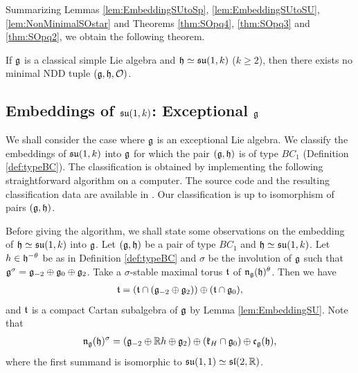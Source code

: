 Summarizing Lemmas \ref{lem:EmbeddingSUtoSp}, \ref{lem:EmbeddingSUtoSU}, \ref{lem:NonMinimalSOstar} and Theorems \ref{thm:SOpq4}, \ref{thm:SOpq3} and \ref{thm:SOpq2}, we obtain the following theorem.

\begin{theorem} \label{thm:NonMinimalClassical}
	If $\mathfrak{g}$ is a classical simple Lie algebra and $\mathfrak{h} \simeq \mathfrak{su}(1, k)$ ($k \geq 2$), then there exists no minimal NDD tuple $(\mathfrak{g}, \mathfrak{h}, \mathcal{O})$.
\end{theorem}

\subsection{Embeddings of \texorpdfstring{$\mathfrak{su}(1, k)$}{su(1,k)}: Exceptional \texorpdfstring{$\mathfrak{g}$}{g}}

We shall consider the case where $\mathfrak{g}$ is an exceptional Lie algebra.
We classify the embeddings of $\mathfrak{su}(1, k)$ into $\mathfrak{g}$ for which the pair $(\mathfrak{g}, \mathfrak{h})$ is of type $BC_1$ (Definition \ref{def:typeBC}).
The classification is obtained by implementing the following straightforward algorithm on a computer.
The source code and the resulting classification data are available in \cite{Ki26-code}.
Our classification is up to isomorphism of pairs $(\mathfrak{g}, \mathfrak{h})$.

Before giving the algorithm, we shall state some observations on the embedding of $\mathfrak{h} \simeq \mathfrak{su}(1, k)$ into $\mathfrak{g}$.
Let $(\mathfrak{g}, \mathfrak{h})$ be a pair of type $BC_1$ and $\mathfrak{h} \simeq \mathfrak{su}(1, k)$.
Let $h \in \mathfrak{h}^{-\theta}$ be as in Definition \ref{def:typeBC} and $\sigma$ be the involution of $\mathfrak{g}$ such that $\mathfrak{g}^\sigma = \mathfrak{g}_{-2} \oplus \mathfrak{g}_0 \oplus \mathfrak{g}_2$.
Take a $\sigma$-stable maximal torus $\mathfrak{t}$ of $\mathfrak{n}_{\mathfrak{g}}(\mathfrak{h})^\theta$.
Then we have
\begin{align*}
	\mathfrak{t} = (\mathfrak{t}\cap (\mathfrak{g}_{-2} \oplus \mathfrak{g}_2)) \oplus (\mathfrak{t}\cap \mathfrak{g}_0),
\end{align*}
and $\mathfrak{t}$ is a compact Cartan subalgebra of $\mathfrak{g}$ by Lemma \ref{lem:EmbeddingSU}.
Note that
\begin{align*}
	\mathfrak{n}_{\mathfrak{g}}(\mathfrak{h})^\sigma = (\mathfrak{g}_{-2}\oplus \mathbb{R} h \oplus \mathfrak{g}_2) \oplus (\mathfrak{k}_H\cap \mathfrak{g}_0) \oplus \mathfrak{c}_{\mathfrak{g}}(\mathfrak{h}),
\end{align*}
where the first summand is isomorphic to $\mathfrak{su}(1, 1) \simeq \mathfrak{sl}(2, \mathbb{R})$.

